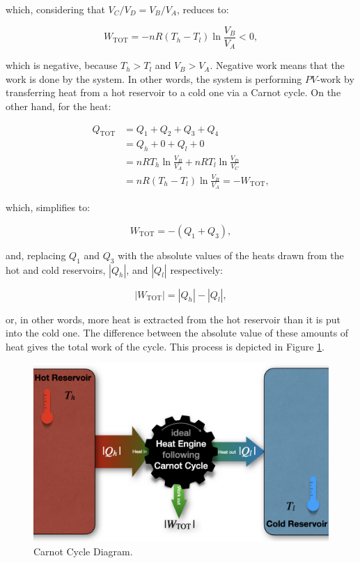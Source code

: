\documentclass[
  9pt,
]{extbook}
\theoremstyle{definition}
\theoremstyle{definition}
\theoremstyle{definition}
\theoremstyle{definition}
\theoremstyle{remark}
\begin{document}
which, considering that \(V_C/V_D=V_B/V_A\), reduces to:

\begin{equation}
  W_{\text{TOT}} = - nR \left( T_h-T_l \right) \ln \frac{V_B}{V_A} < 0,
  \label{eq:WtotCC2}
\end{equation}

which is negative, because \(T_h>T_l\) and \(V_B>V_A\). Negative work means that the work is done by the system. In other words, the system is performing \(PV\)-work by transferring heat from a hot reservoir to a cold one via a Carnot cycle. On the other hand, for the heat:

\begin{equation}
\begin{aligned}
  Q_{\text{TOT}} & = Q_1+Q_2+Q_3+Q_4 \\
                 & = Q_h + 0 + Q_l + 0    \\
                 & = nRT_h \ln \frac{V_B}{V_A} + nRT_l \ln \frac{V_D}{V_C} \\
                 & = nR \left( T_h-T_l \right) \ln \frac{V_B}{V_A} = -W_{\text{TOT}},
\end{aligned}
  \label{eq:QtotCC}
\end{equation}

which, simplifies to:

\begin{equation}
W_{\text{TOT}}=-(Q_1+Q_3),
  \label{eq:WtotCC3}
\end{equation}

and, replacing \(Q_1\) and \(Q_3\) with the absolute values of the heats drawn from the hot and cold reservoirs, \(\left| Q_h \right|\), and \(\left| Q_l \right|\) respectively:

\begin{equation}
\left| W_{\text{TOT}} \right| = \left| Q_h \right| - \left| Q_l \right|,
  \label{eq:QtotCC2}
\end{equation}

or, in other words, more heat is extracted from the hot reservoir than it is put into the cold one. The difference between the absolute value of these amounts of heat gives the total work of the cycle. This process is depicted in Figure \ref{fig:FigCarnotEff}.

\begin{figure}

{\centering \includegraphics[width=0.8\linewidth]{./img/OEP_Figures.009} 

}

\caption{Carnot Cycle Diagram.}\label{fig:FigCarnotEff}
\end{figure}
\end{document}
